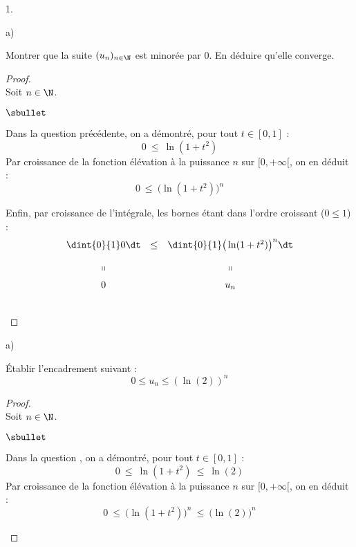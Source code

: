 \documentclass[11pt]{article}%
\begin{document}
\begin{noliste}{1.}
\begin{noliste}{a)}
  \item Montrer que la suite $(u_n)_{n \in \N}$ est minorée par
    $0$. En déduire qu'elle converge.

    \begin{proof}~\\%
      Soit $n \in \N$.
      \begin{noliste}{$\sbullet$}
      \item Dans la question précédente, on a démontré, pour tout $t
        \in [0, 1]$ :
        \[
        0 \ \leq \ \ln(1 + t^2)
        \]
        Par croissance de la fonction élévation à la puissance $n$ sur
        $[0, +\infty[$, on en déduit : 
        \[
        0 \ \leq \ \big( \ln(1 + t^2) \big)^n
        \]

      \item Enfin, par croissance de l'intégrale, les bornes étant
        dans l'ordre croissant ($0 \leq 1$) : 
        \[
        \begin{array}{ccc}
          \dint{0}{1} 0 \dt & \leq & \dint{0}{1} \big( \ln(1 + t^2)
          \big)^n \dt
          \\[.4cm]
          \shortparallel & & \shortparallel
          \\[.2cm]
          0 &  & u_n
        \end{array}
        \]
      \end{noliste}
      ~\\[-1cm]
    \end{proof}
  \end{noliste}  

\item
  \begin{noliste}{a)}
    \setlength{\itemsep}{2mm}
  \item Établir l'encadrement suivant :
    \[
    0 \leq u_n \leq (\ln(2))^n
    \]

    \begin{proof}~\\%
      Soit $n \in \N$.
      \begin{noliste}{$\sbullet$}
      \item Dans la question , on a démontré, pour tout $t
        \in [0, 1]$ :
        \[
        0 \ \leq \ \ln(1 + t^2) \ \leq \ \ln(2)
        \]
        Par croissance de la fonction élévation à la puissance $n$ sur
        $[0, +\infty[$, on en déduit : 
        \[
        0 \ \leq \ \big( \ln(1 + t^2) \big)^n \ \leq \ \big( \ln(2)
        \big)^n
        \]



\end{noliste}
\end{proof}
\end{noliste}
\end{noliste}
\end{document}
